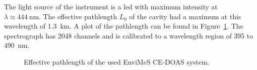 The light source of the instrument is a led with maximum intensity at
$\lambda \approx \SI{444}{\nano\meter}$. The effective pathlength
$L_0$ of the cavity had a maximum at this wavelength of
\SI{1.3}{\kilo\meter}. A plot of the pathlength can be found in
Figure~\ref{fig:pathlength}. The spectrograph has \num{2048} channels
and is calibrated to a wavelength region of \num{395} to
\SI{490}{\nano\meter}.

\begin{figure}[htbp]
  \centering
  
  \caption{Effective pathlength of the used EnviMeS CE-DOAS system.}
  \label{fig:pathlength}
\end{figure}

